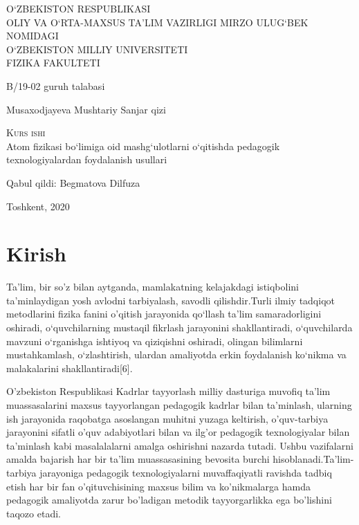 \documentclass[epsf]{article}
\begin{document}
\begin{titlepage}
  \begin{center}
    \large
    O`ZBEKISTON RESPUBLIKASI\\ OLIY VA O`RTA-MAXSUS TA'LIM VAZIRLIGI
        MIRZO ULUG`BEK NOMIDAGI\\O`ZBEKISTON MILLIY UNIVERSITETI\\FIZIKA FAKULTETI
    \vspace{0.25cm}
     
 \vfill
     
    \Large B/19-02 guruh talabasi
    
     
     
    \Huge{Musaxodjayeva Mushtariy Sanjar qizi}
   
 
    \textsc{Kurs ishi}\\[5mm]
     
    {\Huge Atom fizikasi bo`limiga oid mashg`ulotlarni o`qitishda pedagogik texnologiyalardan foydalanish usullari\\
      }
  \bigskip
\end{center}
\vfill

 \huge Qabul qildi: Begmatova Dilfuza
 \vfill


\begin{center}
  Toshkent, 2020
\end{center}
\end{titlepage}
\newpage
\renewcommand{\contentsname}{Mundarija}
\tableofcontents
\newpage
\section{Kirish}
\hspace{0.4cm}
Ta’lim, bir so’z bilan aytganda, mamlakatning kelajakdagi istiqbolini
ta’minlaydigan yosh avlodni tarbiyalash, savodli qilishdir.Turli ilmiy tadqiqot
metodlarini fizika fanini o’qitish jarayonida qo‘llash ta’lim samaradorligini oshiradi,
o‘quvchilarning mustaqil fikrlash jarayonini shakllantiradi, o‘quvchilarda mavzuni
o‘rganishga ishtiyoq va qiziqishni oshiradi, olingan bilimlarni mustahkamlash,
o‘zlashtirish, ulardan amaliyotda erkin foydalanish ko‘nikma va malakalarini
shakllantiradi[6].

O’zbekiston Respublikasi Kadrlar tayyorlash milliy dasturiga muvofiq ta’lim muassasalarini maxsus tayyorlangan pedagogik kadrlar bilan ta’minlash, ularning ish jarayonida raqobatga asoslangan muhitni yuzaga keltirish, o’quv-tarbiya jarayonini sifatli o’quv adabiyotlari bilan va ilg’or pedagogik texnologiyalar bilan ta’minlash kabi masalalalarni amalga oshirishni nazarda tutadi.  Ushbu vazifalarni amalda bajarish har bir ta’lim muassasasining  bevosita burchi hisoblanadi.Ta’lim-tarbiya jarayoniga pedagogik texnologiyalarni muvaffaqiyatli ravishda tadbiq etish har bir fan o’qituvchisining maxsus bilim va ko’nikmalarga hamda pedagogik amaliyotda zarur bo’ladigan metodik tayyorgarlikka ega bo’lishini taqozo etadi.
\end{document}
